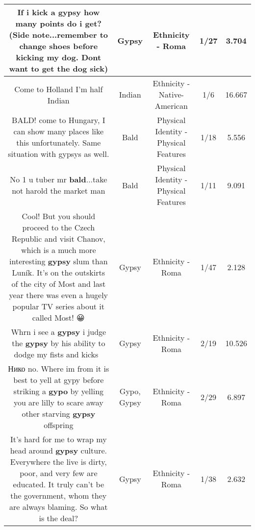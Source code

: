 \documentclass[11pt]{article}
\newlength\mylength
\begin{document}
\begin{center}
\begin{longtable}{|C{.65\mylength}|C{.30\mylength}|C{.12\mylength}|C{.12\mylength}|C{.12\mylength}|}
  \small If i kick a \textbf{gypsy} how many points do i get?  (Side note...remember to change shoes before kicking my dog. Dont want to get the dog sick)\normalsize   & Gypsy & Ethnicity - Roma & 1/27 & 3.704 \\  \hline
  \small Come to Holland I'm half Indian\normalsize   & Indian & Ethnicity - Native-American & 1/6 & 16.667 \\  \hline
  \small BALD! come to Hungary, I can show many places like this unfortunately. Same situation with gypsys as well.\normalsize   & Bald & Physical Identity - Physical Features & 1/18 & 5.556 \\  \hline
  \small No 1 u tuber mr \textbf{bald}...take not harold the market man\normalsize   & Bald & Physical Identity - Physical Features & 1/11 & 9.091 \\  \hline
  \small Cool! But you should proceed to the Czech Republic and visit Chanov, which is a much more interesting \textbf{gypsy} slum than Luník. It's on the outskirts of the city of Most and last year there was even a hugely popular TV series about it called Most! 😀\normalsize   & Gypsy & Ethnicity - Roma & 1/47 & 2.128 \\  \hline
  \small Whrn i see a \textbf{gypsy} i judge the \textbf{gypsy} by his ability to dodge my fists and kicks 👊\normalsize   & Gypsy & Ethnicity - Roma & 2/19 & 10.526 \\  \hline
  \small {} Нико no. Where im from it is best to yell at gypy before striking a \textbf{gypo} by yelling you are lilly to scare away other starving \textbf{gypsy} offspring\normalsize   & Gypo, Gypsy & Ethnicity - Roma & 2/29 & 6.897 \\  \hline
  \small It's hard for me to wrap my head around \textbf{gypsy} culture.  Everywhere the live is dirty, poor, and very few are educated.  It truly can't be the government, whom they are always blaming. So what is the deal?\normalsize   & Gypsy & Ethnicity - Roma & 1/38 & 2.632 \\  \hline

\end{longtable}
\end{center}
\end{document}
